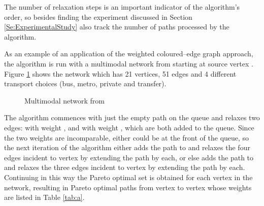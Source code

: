 \documentclass[preprint,authoryear,12pt]{elsarticle}
\begin{document}
The number of relaxation steps is an important indicator of the algorithm's
order, so besides finding  the experiment discussed in
Section \ref{Se:ExperimentalStudy} also track the number of paths
 processed by the algorithm.

As an example of an application of the weighted
coloured--edge graph approach, the algorithm is run with a
multimodal network from \cite{Lozano2001} starting at source vertex .
Figure \ref{fig00} shows the network which has 21 vertices,
51 edges and 4 different transport choices
(bus, metro, private and transfer).
\begin{figure}
\begin{tiny}

\end{tiny}
\caption{Multimodal network from \cite{Lozano2001}}
\label{fig00}
\end{figure}
The algorithm commences with just the empty path  on the queue and
relaxes two edges:  with weight
,
and  with weight , which are both added to the queue.
Since the two weights are incomparable, either could be at the front of the queue,
so the next iteration of the algorithm either adds the path 
to  and relaxes the four edges incident to vertex  by extending the
path  by each, or else adds the path  to 
and relaxes the three edges incident to vertex  by extending the path  by each.
Continuing in this way the Pareto optimal set  is obtained for
each vertex  in the network, resulting in  Pareto optimal paths from vertex 
to vertex  whose weights are listed in Table \ref{tab:a}.
\end{document}
